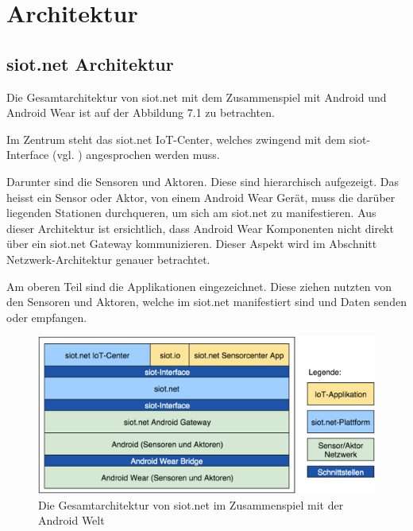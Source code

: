 \chapter{Architektur}
\section{siot.net Architektur}
Die Gesamtarchitektur von siot.net mit dem Zusammenspiel mit Android und Android Wear ist auf der Abbildung 7.1 zu betrachten.

Im Zentrum steht das siot.net \gls{IoT}-Center, welches zwingend mit dem siot-Interface (vgl. \cite{siot:cobo}) angesprochen werden muss.

Darunter sind die Sensoren und Aktoren. Diese sind hierarchisch aufgezeigt. Das heisst ein Sensor oder Aktor, von einem Android Wear Gerät, muss die darüber liegenden Stationen durchqueren, um sich am siot.net zu manifestieren. Aus dieser Architektur ist ersichtlich, dass Android Wear Komponenten nicht direkt über ein siot.net Gateway kommunizieren. Dieser Aspekt wird im Abschnitt Netzwerk-Architektur genauer betrachtet.

Am oberen Teil sind die Applikationen eingezeichnet. Diese ziehen nutzten von den Sensoren und Aktoren, welche im siot.net manifestiert sind und Daten senden oder empfangen.
\begin{figure}[h]
  \centering
  \includegraphics[scale=0.38]{98_Bilder/07_Architektur/ArchitekturSiot}
  \caption[Gesamtarchitektur zu siot.net]{Die Gesamtarchitektur von siot.net im Zusammenspiel mit der Android Welt}
\end{figure}
\newpage
